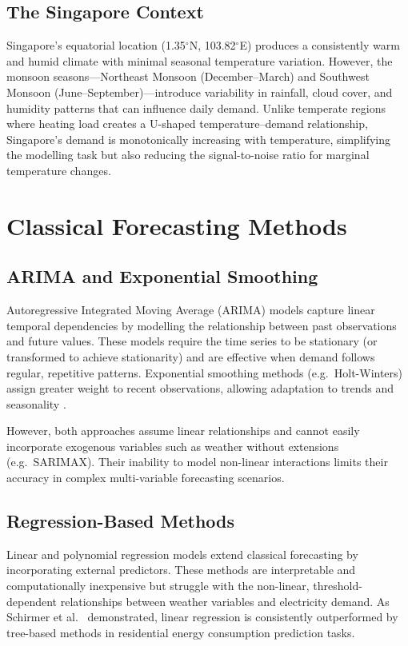 \subsection{The Singapore Context}

Singapore's equatorial location (1.35$^\circ$N, 103.82$^\circ$E) produces a consistently warm and humid climate with minimal seasonal temperature variation. However, the monsoon seasons---Northeast Monsoon (December--March) and Southwest Monsoon (June--September)---introduce variability in rainfall, cloud cover, and humidity patterns that can influence daily demand. Unlike temperate regions where heating load creates a U-shaped temperature--demand relationship, Singapore's demand is monotonically increasing with temperature, simplifying the modelling task but also reducing the signal-to-noise ratio for marginal temperature changes.


\section{Classical Forecasting Methods}

\subsection{ARIMA and Exponential Smoothing}

Autoregressive Integrated Moving Average (ARIMA) models capture linear temporal dependencies by modelling the relationship between past observations and future values. These models require the time series to be stationary (or transformed to achieve stationarity) and are effective when demand follows regular, repetitive patterns. Exponential smoothing methods (e.g.\ Holt-Winters) assign greater weight to recent observations, allowing adaptation to trends and seasonality \parencite{almusaylh2018forecasting}.

However, both approaches assume linear relationships and cannot easily incorporate exogenous variables such as weather without extensions (e.g.\ SARIMAX). Their inability to model non-linear interactions limits their accuracy in complex multi-variable forecasting scenarios.

\subsection{Regression-Based Methods}

Linear and polynomial regression models extend classical forecasting by incorporating external predictors. These methods are interpretable and computationally inexpensive but struggle with the non-linear, threshold-dependent relationships between weather variables and electricity demand. As Schirmer et al.\ \parencite{schirmer2019evaluation} demonstrated, linear regression is consistently outperformed by tree-based methods in residential energy consumption prediction tasks.


